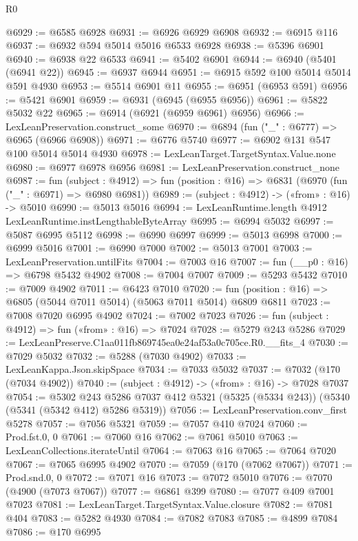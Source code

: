 \begin{lexlean}{R0}
\begin{coremodule}
@6929 := @6585 @6928
@6931 := @6926 @6929 @6908
@6932 := @6915 @116
@6937 := @6932 @594 @5014 @5016 @6533 @6928
@6938 := @5396 @6901
@6940 := @6938 @22 @6533
@6941 := @5402 @6901
@6944 := @6940 (@5401 (@6941 @22))
@6945 := @6937 @6944
@6951 := @6915 @592 @100 @5014 @5014 @591 @4930
@6953 := @5514 @6901 @11
@6955 := @6951 (@6953 @591)
@6956 := @5421 @6901
@6959 := @6931 (@6945 (@6955 @6956))
@6961 := @5822 @5032 @22
@6965 := @6914 (@6921 (@6959 @6961) @6956)
@6966 := LexLeanPreservation.construct_some
@6970 := @6894 (fun ("_" : @6777) => @6965 (@6966 @6908))
@6971 := @6776 @5740
@6977 := @6902 @131 @547 @100 @5014 @5014 @4930
@6978 := LexLeanTarget.TargetSyntax.Value.none
@6980 := @6977 @6978 @6956
@6981 := LexLeanPreservation.construct_none
@6987 := fun (subject : @4912) =>
  fun (position : @16) => @6831 (@6970 (fun ("_" : @6971) => @6980 @6981))
@6989 := (subject : @4912) -> («from» : @16) -> @5010
@6990 := @5013 @5016
@6994 := LexLeanRuntime.length @4912 LexLeanRuntime.instLengthableByteArray
@6995 := @6994 @5032
@6997 := @5087 @6995 @5112
@6998 := @6990 @6997
@6999 := @5013 @6998
@7000 := @6999 @5016
@7001 := @6990 @7000
@7002 := @5013 @7001
@7003 := LexLeanPreservation.untilFits
@7004 := @7003 @16
@7007 := fun (__p0 : @16) => @6798 @5432 @4902
@7008 := @7004 @7007
@7009 := @5293 @5432
@7010 := @7009 @4902
@7011 := @6423 @7010
@7020 := fun (position : @16) => @6805 (@5044 @7011 @5014) (@5063 @7011 @5014) @6809 @6811
@7023 := @7008 @7020 @6995 @4902
@7024 := @7002 @7023
@7026 := fun (subject : @4912) => fun («from» : @16) => @7024
@7028 := @5279 @243 @5286
@7029 := LexLeanPreserve.C1aa011fb869745ea0e24af53a0c705ce.R0.__fits_4
@7030 := @7029 @5032
@7032 := @5288 (@7030 @4902)
@7033 := LexLeanKappa.Json.skipSpace
@7034 := @7033 @5032
@7037 := @7032 (@170 (@7034 @4902))
@7040 := (subject : @4912) -> («from» : @16) -> @7028 @7037
@7054 := @5302
    @243
    @5286
    @7037
    @412
    @5321
    (@5325 (@5334 @243))
    (@5340 (@5341 (@5342 @412) @5286 @5319))
@7056 := LexLeanPreservation.conv_first @5278
@7057 := @7056 @5321
@7059 := @7057 @410 @7024
@7060 := Prod.fst.{0, 0}
@7061 := @7060 @16
@7062 := @7061 @5010
@7063 := LexLeanCollections.iterateUntil
@7064 := @7063 @16
@7065 := @7064 @7020
@7067 := @7065 @6995 @4902
@7070 := @7059 (@170 (@7062 @7067))
@7071 := Prod.snd.{0, 0}
@7072 := @7071 @16
@7073 := @7072 @5010
@7076 := @7070 (@4900 (@7073 @7067))
@7077 := @6861 @399
@7080 := @7077 @409 @7001 @7023
@7081 := LexLeanTarget.TargetSyntax.Value.closure
@7082 := @7081 @404
@7083 := @5282 @4930
@7084 := @7082 @7083
@7085 := @4899 @7084
@7086 := @170 @6995

\end{coremodule}
\end{lexlean}
